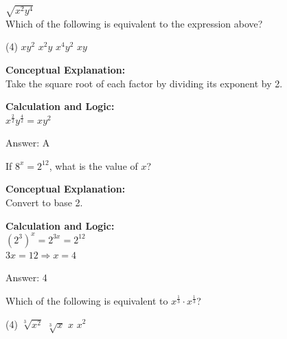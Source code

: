 \documentclass[11pt,paper=a4,answers]{exam}
\begin{document}
\begin{questions}
\vspace{40pt}

\question
$\sqrt{x^2 y^4}$ \\
Which of the following is equivalent to the expression above?
\begin{tasks}(4)
    \task $xy^2$
    \task $x^2 y$
    \task $x^4 y^2$
    \task $x y$
\end{tasks}

\begin{solution}
\textbf{Conceptual Explanation:} \\
Take the square root of each factor by dividing its exponent by 2.

\vspace{20pt}

\textbf{Calculation and Logic:} \\
$x^{\frac{2}{2}} y^{\frac{4}{2}} = xy^2$

\vspace{25pt}

Answer: \colorbox{yellow!100}{A}
\end{solution}

\vspace{40pt}

\question
If $8^x = 2^{12}$, what is the value of $x$?

\begin{solution}
\textbf{Conceptual Explanation:} \\
Convert to base 2.

\vspace{20pt}

\textbf{Calculation and Logic:} \\
$(2^3)^x = 2^{3x} = 2^{12}$ \\
$3x = 12 \Rightarrow x = 4$

\vspace{25pt}

Answer: \colorbox{yellow!100}{4}
\end{solution}

\vspace{40pt}

\question
Which of the following is equivalent to $x^{\frac{1}{3}} \cdot x^{\frac{1}{3}}$?
\begin{tasks}(4)
    \task $\sqrt[3]{x^2}$
    \task $\sqrt[3]{x}$
    \task $x$
    \task $x^2$
\end{tasks}


\end{questions}
\end{document}
